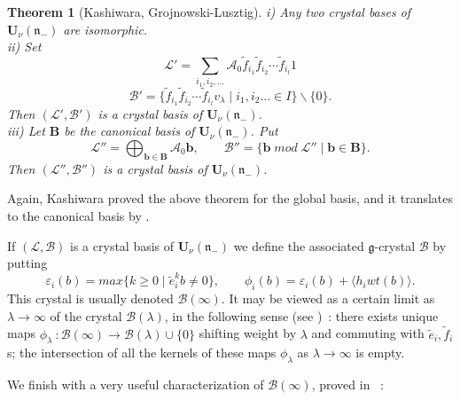 \documentclass[a4paper,10pt]{amsart}
\def\U{\mathbf{U}}
\def\g{\mathfrak{g}}
\def\n{\mathfrak{n}}
\newtheorem{theo}{\bf{Theorem}}[section]
\numberwithin{equation}{section}
\begin{document}
\begin{theo}[Kashiwara, Grojnowski-Lusztig]\label{T:Kassw} i) Any two crystal bases of $\U_{\nu}(\n_-)$ are isomorphic.\\
ii) Set
$$\mathcal{L}'=\sum_{i_1, i_2, \ldots} \mathcal{A}_{0} \tilde{f}_{i_1} \tilde{f}_{i_2} \cdots \tilde{f}_{i_l} 1$$
$$\mathcal{B}'=\big\{ \tilde{f}_{i_1} \tilde{f}_{i_2} \cdots \tilde{f}_{i_l} v_{\lambda}\;|\; i_1, i_2 \ldots \in I\big\} \backslash \{0\}.$$
Then $(\mathcal{L}', \mathcal{B}')$ is a crystal basis of $\U_{\nu}(\n_-)$.\\
iii) Let $\mathbf{B}$ be the canonical basis of $\U_{\nu}(\n_-)$. Put
$$\mathcal{L}''=\bigoplus_{\mathbf{b} \in \mathbf{B}} \mathcal{A}_0 \mathbf{b}, \qquad \mathcal{B}''=\{ \mathbf{b}\;mod\;\mathcal{L}'' \;|\; \mathbf{b} \in \mathbf{B}\}.$$
Then $(\mathcal{L}'', \mathcal{B}'')$ is a crystal basis of $\U_{\nu}(\n_-)$.
\end{theo}

\vspace{.1in}

Again, Kashiwara proved the above theorem for the global basis, and it translates to the canonical basis by \cite{GL}.

\vspace{.1in}

If $(\mathcal{L}, \mathcal{B})$ is a crystal basis of $\U_{\nu}(\n_-)$ we define the associated $\g$-crystal $\mathcal{B}$ by putting
$$\varepsilon_i(b)=max\{k \geq 0\;|\; \tilde{e}_i^kb \neq 0\}, \qquad \phi_i(b)=\varepsilon_i(b) + \langle h_i wt(b)\rangle.$$
This crystal is usually denoted $\mathcal{B}(\infty)$. It may be viewed as a certain limit as $\lambda \to \infty$ of the crystal $\mathcal{B}(\lambda)$, in the following sense (see \cite[Section~3.13.]{Jo} )~: there exists unique maps $\phi_{\lambda}~: \mathcal{B}(\infty) \to \mathcal{B}(\lambda) \cup \{0\}$ shifting weight by $\lambda$ and commuting with $\tilde{e}_i, \tilde{f}_i$s; the intersection of all the kernels of these maps $\phi_{\lambda}$ as $\lambda \to \infty$ is empty. 

\vspace{.1in}

We finish with a very useful characterization of $\mathcal{B}(\infty)$, proved in \cite{KS}~:

\vspace{.1in}
\end{document}
